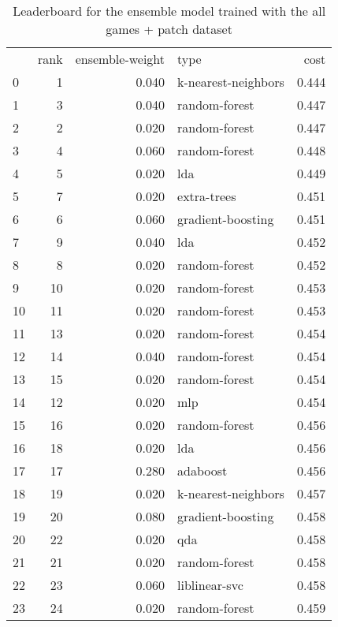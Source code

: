 \begin{table}[]
	\centering
	\begin{tabular}{lrrlr}
		   & rank & ensemble-weight & type                & cost  \\
		0  & 1    & 0.040           & k-nearest-neighbors & 0.444 \\
		1  & 3    & 0.040           & random-forest       & 0.447 \\
		2  & 2    & 0.020           & random-forest       & 0.447 \\
		3  & 4    & 0.060           & random-forest       & 0.448 \\
		4  & 5    & 0.020           & lda                 & 0.449 \\
		5  & 7    & 0.020           & extra-trees         & 0.451 \\
		6  & 6    & 0.060           & gradient-boosting   & 0.451 \\
		7  & 9    & 0.040           & lda                 & 0.452 \\
		8  & 8    & 0.020           & random-forest       & 0.452 \\
		9  & 10   & 0.020           & random-forest       & 0.453 \\
		10 & 11   & 0.020           & random-forest       & 0.453 \\
		11 & 13   & 0.020           & random-forest       & 0.454 \\
		12 & 14   & 0.040           & random-forest       & 0.454 \\
		13 & 15   & 0.020           & random-forest       & 0.454 \\
		14 & 12   & 0.020           & mlp                 & 0.454 \\
		15 & 16   & 0.020           & random-forest       & 0.456 \\
		16 & 18   & 0.020           & lda                 & 0.456 \\
		17 & 17   & 0.280           & adaboost            & 0.456 \\
		18 & 19   & 0.020           & k-nearest-neighbors & 0.457 \\
		19 & 20   & 0.080           & gradient-boosting   & 0.458 \\
		20 & 22   & 0.020           & qda                 & 0.458 \\
		21 & 21   & 0.020           & random-forest       & 0.458 \\
		22 & 23   & 0.060           & liblinear-svc       & 0.458 \\
		23 & 24   & 0.020           & random-forest       & 0.459 \\
	\end{tabular}

	\caption{Leaderboard for the ensemble model trained with the all games + patch dataset}
	\label{tab:lb-all-games-with-patch}
\end{table}

